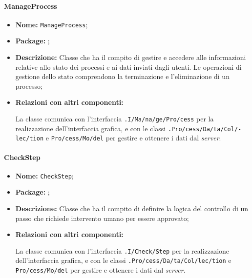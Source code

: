 \paragraph{ManageProcess}
\begin{flushleft}
\begin{itemize}
\item \textbf{Nome:} \texttt{ManageProcess};
\item \textbf{Package:} \texttt{\logicAdmin{}};
\item \textbf{Descrizione:} Classe che ha il compito di gestire e accedere alle informazioni relative allo stato dei processi e ai dati inviati dagli utenti. Le operazioni di gestione dello stato comprendono la terminazione e l'eliminazione di un processo;
\item \textbf{Relazioni con altri componenti:}
\begin{sloppypar}
La classe comunica con l'interfaccia \texttt{\viewAdmin{}.I\fshyp{}Ma\fshyp{}na\fshyp{}ge\fshyp{}Pro\fshyp{}cess} per la realizzazione dell'interfaccia grafica, e con le classi \texttt{\collectionp{}.Pro\fshyp{}cess\fshyp{}Da\fshyp{}ta\fshyp{}Col\fshyp{}lec\fshyp{}tion} e \texttt{\model{}Pro\fshyp{}cess\fshyp{}Mo\fshyp{}del} per gestire e ottenere i dati dal \textit{server}.
\end{sloppypar}
\end{itemize}
\end{flushleft}

\paragraph{CheckStep}
\begin{flushleft}
\begin{itemize}
\item \textbf{Nome:} \texttt{CheckStep};
\item \textbf{Package:} \texttt{\logicAdmin{}};
\item \textbf{Descrizione:} Classe che ha il compito di definire la logica del controllo di un passo che richiede intervento umano per essere approvato;
\item \textbf{Relazioni con altri componenti:}
\begin{sloppypar}
La classe comunica con l'interfaccia \texttt{\viewAdmin{}.I\fshyp{}Check\fshyp{}Step} per la realizzazione dell'interfaccia grafica, e con le classi \texttt{\collectionp{}.Pro\fshyp{}cess\fshyp{}Da\fshyp{}ta\fshyp{}Col\fshyp{}lec\fshyp{}tion} e \texttt{\model{}Pro\fshyp{}cess\fshyp{}Mo\fshyp{}del} per gestire e ottenere i dati dal \textit{server}.
\end{sloppypar}
\end{itemize}
\end{flushleft}